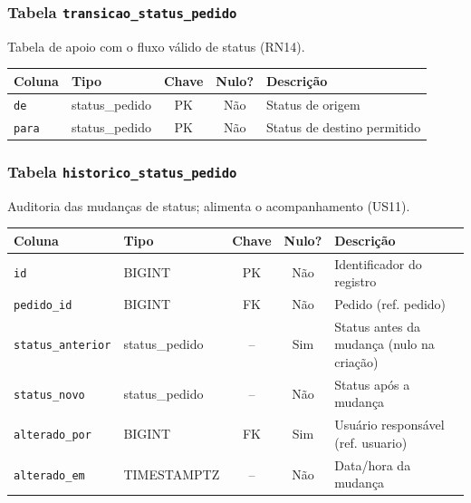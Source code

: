 \subsubsection{Tabela \texttt{transicao\_status\_pedido}}
\noindent Tabela de apoio com o fluxo válido de status (RN14).\par\smallskip
\begingroup\footnotesize\renewcommand{\arraystretch}{1.2}
\begin{longtable}{|p{3.0cm}|p{2.6cm}|c|c|p{5.6cm}|}
\hline
\rowcolor{gray!40}\textbf{Coluna} & \textbf{Tipo} & \textbf{Chave} & \textbf{Nulo?} & \textbf{Descrição} \\ \hline
\endhead
\texttt{de} & status\_pedido & PK & Não & Status de origem \\ \hline
\texttt{para} & status\_pedido & PK & Não & Status de destino permitido \\ \hline
\end{longtable}
\endgroup
\subsubsection{Tabela \texttt{historico\_status\_pedido}}
\noindent Auditoria das mudanças de status; alimenta o acompanhamento (US11).\par\smallskip
\begingroup\footnotesize\renewcommand{\arraystretch}{1.2}
\begin{longtable}{|p{3.0cm}|p{2.6cm}|c|c|p{5.6cm}|}
\hline
\rowcolor{gray!40}\textbf{Coluna} & \textbf{Tipo} & \textbf{Chave} & \textbf{Nulo?} & \textbf{Descrição} \\ \hline
\endhead
\texttt{id} & BIGINT & PK & Não & Identificador do registro \\ \hline
\texttt{pedido\_id} & BIGINT & FK & Não & Pedido (ref. pedido) \\ \hline
\texttt{status\_anterior} & status\_pedido & -- & Sim & Status antes da mudança (nulo na criação) \\ \hline
\texttt{status\_novo} & status\_pedido & -- & Não & Status após a mudança \\ \hline
\texttt{alterado\_por} & BIGINT & FK & Sim & Usuário responsável (ref. usuario) \\ \hline
\texttt{alterado\_em} & TIMESTAMPTZ & -- & Não & Data/hora da mudança \\ \hline
\end{longtable}
\endgroup
